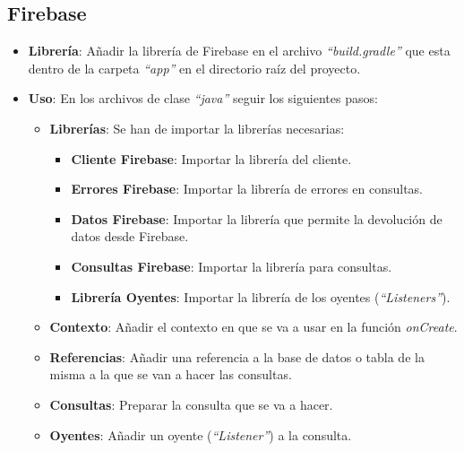 	\newpage %
	\subsection{Firebase}
		\begin{itemize}
			\item {\bf Librería}: Añadir la librería de Firebase en el archivo {\it ``build.gradle''} que esta dentro de la carpeta {\it ``app''} en el directorio raíz del proyecto.
				
				
			\newpage
			\item {\bf Uso}: En los archivos de clase {\it ``java''}\cite{14:java:online} seguir los siguientes pasos:
				\begin{itemize}
					\item {\bf Librerías}: Se han de importar la librerías necesarias:
						\begin{itemize}
							\item {\bf Cliente Firebase}: Importar la librería del cliente.
							\item {\bf Errores Firebase}: Importar la librería de errores en consultas.
							\item {\bf Datos Firebase}: Importar la librería que permite la devolución de datos desde Firebase.
							\item {\bf Consultas Firebase}: Importar la librería para consultas.
							\item {\bf Librería Oyentes}: Importar la librería de los oyentes ({\it ``Listeners''}).
						\end{itemize}
					\item {\bf Contexto}: Añadir el contexto en que se va a usar en la función {\it onCreate}.
					\item {\bf Referencias}: Añadir una referencia a la base de datos o tabla de la misma a la que se van a hacer las consultas.
					\item {\bf Consultas}: Preparar la consulta que se va a hacer.
					\item {\bf Oyentes}: Añadir un oyente ({\it ``Listener''}) a la consulta.
				\end{itemize}
		\end{itemize}
		
		
		
